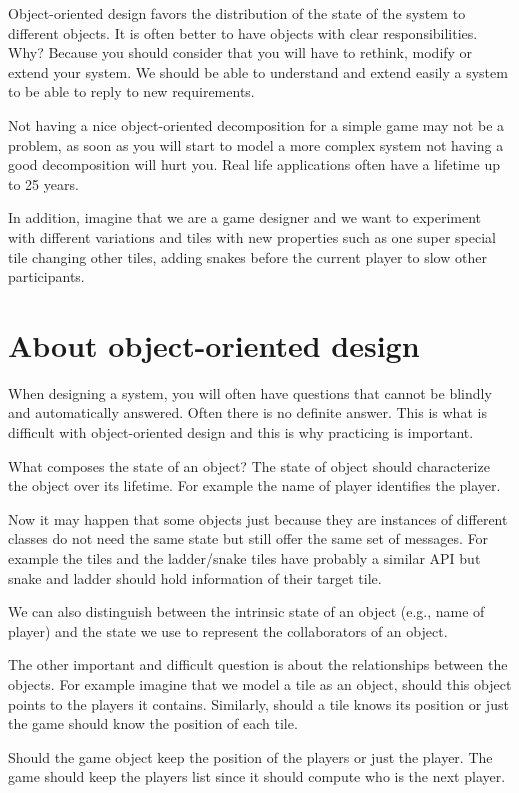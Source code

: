 \documentclass[10pt,twoside,english]{_support/latex/sbabook/sbabook}
\begin{document}
Object-oriented design favors the distribution of the state of the system to different objects.
It is often better to have objects with clear responsibilities. Why? Because you should consider that you will have to rethink, modify or extend your system. We should be able to understand and extend easily a system to be able to reply to new requirements.

Not having a nice object-oriented decomposition for a simple game may not be a problem, as soon as you will start to  model a more complex system not having a good decomposition will hurt you. Real life applications often have a lifetime up to 25 years. 

In addition, imagine that we are a game designer and we want to experiment with different variations and tiles with new properties such as one super special tile changing other tiles, adding snakes before the current player to slow other participants.
\section{About object-oriented design}
When designing a system, you will often have questions that cannot be blindly and automatically answered. Often there is no definite answer. This is what is difficult with object-oriented design and this is why practicing is important. 

What composes the state of an object?
The state of object should characterize the object over its lifetime. For example the name of  player identifies the player.

Now it may happen that some objects just because they are instances of different classes
do not need the same state but still offer the same set of messages. For example the tiles and the ladder/snake tiles have probably a similar API but snake and ladder should hold information of their target tile.

We can also distinguish between the intrinsic state of an object (e.g., name of player) and the state we use to represent the collaborators of an object. 

The other important and difficult question is about the relationships between the objects. 
For example imagine that we model a tile as an object, should this object points to the players it contains. Similarly, should a tile knows its position or just the game should know the position of each tile. 

Should the game object keep the position of the players or just the player. 
The game should keep the players list since it should compute who is the next player.
\end{document}
